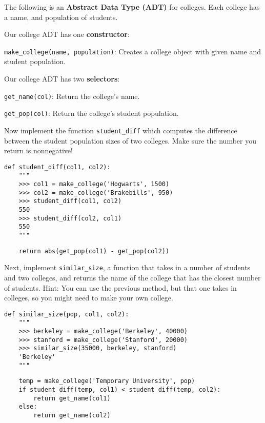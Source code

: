 \begin{blocksection}
\question The following is an \textbf{Abstract Data Type (ADT)} for colleges.
Each college has a name, and population of students. 

Our college ADT has one \textbf{constructor}: 

\lstinline{make_college(name, population)}: Creates a college object with given name and student population. 

Our college ADT has two \textbf{selectors}: 

\lstinline{get_name(col)}: Return the college's name. 

\lstinline{get_pop(col)}: Return the college's student population. 

Now implement the function \lstinline{student_diff} which computes the difference between the student population sizes of two colleges. Make sure the number you return is nonnegative!


\begin{lstlisting}
def student_diff(col1, col2):
    """
    >>> col1 = make_college('Hogwarts', 1500)
    >>> col2 = make_college('Brakebills', 950)
    >>> student_diff(col1, col2)
    550
    >>> student_diff(col2, col1)
    550
    """
\end{lstlisting}
\begin{solution}[1in]
\begin{lstlisting}
    return abs(get_pop(col1) - get_pop(col2))

\end{lstlisting}
\end{solution}

\end{blocksection}


\begin{blocksection}
\question Next, implement \lstinline{similar_size}, a function that takes in a number of students and two colleges, and returns the name of the college that has the closest number of students. Hint: You can use the previous method, but that one takes in colleges, so you might need to make your own college.
 
\begin{lstlisting}
def similar_size(pop, col1, col2):
    """
    >>> berkeley = make_college('Berkeley', 40000)
    >>> stanford = make_college('Stanford', 20000)
    >>> similar_size(35000, berkeley, stanford)
    'Berkeley'
    """
\end{lstlisting}
\begin{solution}[1in]
\begin{lstlisting}
    temp = make_college('Temporary University', pop)
    if student_diff(temp, col1) < student_diff(temp, col2):
        return get_name(col1)
    else:
        return get_name(col2)
\end{lstlisting}
\end{solution}

\end{blocksection}

